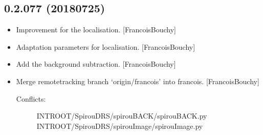\documentclass[a4paper,10pt,english]{report}
\begin{document}
\subsection{0.2.077 (2018\sphinxhyphen{}07\sphinxhyphen{}25)}
\label{\detokenize{misc/changelog:id403}}\begin{itemize}
\item {} 
Improvement for the localisation. {[}FrancoisBouchy{]}

\item {} 
Adaptation parameters for localisation. {[}FrancoisBouchy{]}

\item {} 
Add the background subtraction. {[}FrancoisBouchy{]}

\item {} 
Merge remote\sphinxhyphen{}tracking branch ‘origin/francois’ into francois.
{[}FrancoisBouchy{]}
\begin{description}
\item[{Conflicts:}] \leavevmode
{}
INTROOT/SpirouDRS/spirouBACK/spirouBACK.py
INTROOT/SpirouDRS/spirouImage/spirouImage.py

\end{description}

\end{itemize}
\end{document}
